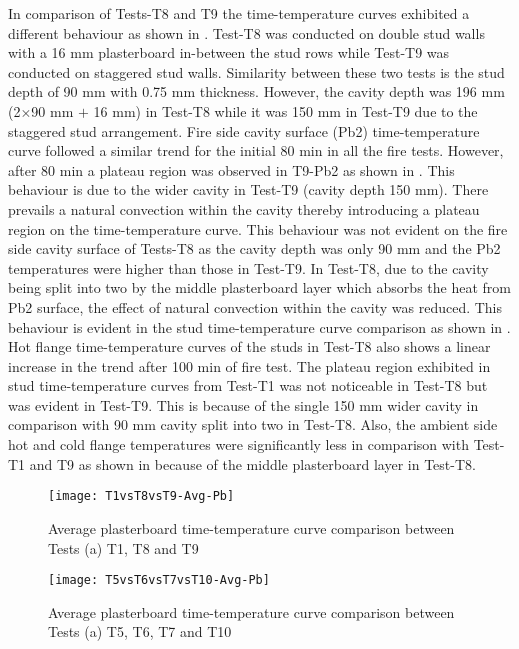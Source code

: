 In comparison of Tests-T8 and T9 the time-temperature curves exhibited a different behaviour as shown in . Test-T8 was conducted on double stud walls with a 16 mm plasterboard in-between the stud rows while Test-T9 was conducted on staggered stud walls. Similarity between these two tests is the stud depth of 90 mm with 0.75 mm thickness. However, the cavity depth was 196 mm (2\(\times\)90 mm \(+\) 16 mm) in Test-T8 while it was 150 mm in Test-T9 due to the staggered stud arrangement. Fire side cavity surface (Pb2) time-temperature curve followed a similar trend for the initial 80 min in all the fire tests. However, after 80 min a plateau region was observed in T9-Pb2 as shown in . This behaviour is due to the wider cavity in Test-T9 (cavity depth 150 mm). There prevails a natural convection within the cavity thereby introducing a plateau region on the time-temperature curve. This behaviour was not evident on the fire side cavity surface of Tests-T8 as the cavity depth was only 90 mm and the Pb2 temperatures were higher than those in Test-T9. In Test-T8, due to the cavity being split into two by the middle plasterboard layer which absorbs the heat from Pb2 surface, the effect of natural convection within the cavity was reduced. This behaviour is evident in the stud time-temperature curve comparison as shown in . Hot flange time-temperature curves of the studs in Test-T8 also shows a linear increase in the trend after 100 min of fire test. The plateau region exhibited in stud time-temperature curves from Test-T1 was not noticeable in Test-T8 but was evident in Test-T9. This is because of the single 150 mm wider cavity in comparison with 90 mm cavity split into two in Test-T8. Also, the ambient side hot and cold flange temperatures were significantly less in comparison with Test-T1 and T9 as shown in  because of the middle plasterboard layer in Test-T8.
\begin{figure}[!htbp]
	\centering
		\texttt{[image: T1vsT8vsT9-Avg-Pb]}  
	\caption{Average plasterboard time-temperature curve comparison between Tests (a) T1, T8 and T9}
	\label{fig:T1vsT8vsT9-Avg-Pb}
\end{figure}
\begin{figure}[!htbp]
	\centering
		\texttt{[image: T5vsT6vsT7vsT10-Avg-Pb]}  
	\caption{Average plasterboard time-temperature curve comparison between Tests (a) T5, T6, T7 and T10}
	\label{fig:T5vsT6vsT7vsT10-Avg-Pb}
\end{figure} 

